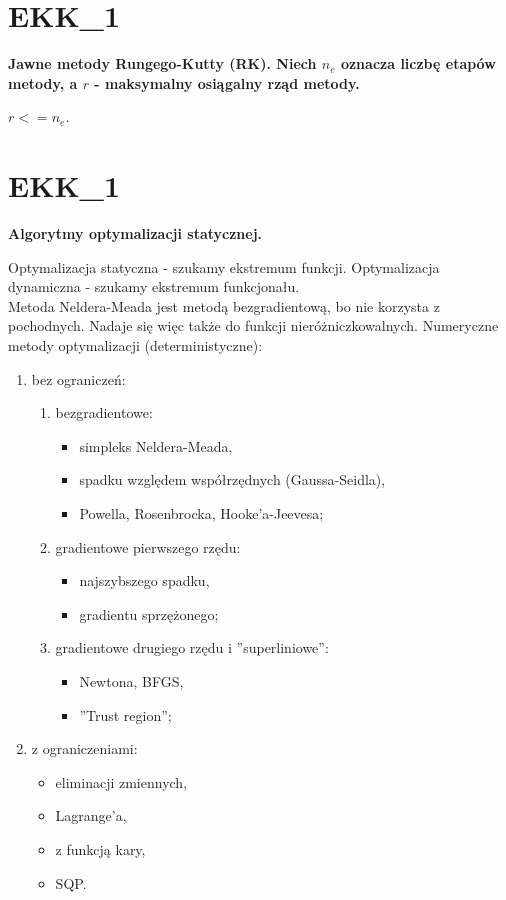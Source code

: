 \section{EKK\_1}
\textbf{Jawne metody Rungego-Kutty (RK). Niech $n_e$ oznacza liczbę etapów metody, a $r$ - maksymalny osiągalny rząd metody.}

\vspace{0.4cm}
\noindent $r<=n_e$.

\section{EKK\_1}
\textbf{Algorytmy optymalizacji statycznej.}

\vspace{0.4cm} Optymalizacja statyczna - szukamy ekstremum funkcji.
Optymalizacja dynamiczna - szukamy ekstremum funkcjonału.\\
Metoda Neldera-Meada jest metodą bezgradientową, bo nie korzysta z pochodnych. Nadaje się więc także do funkcji nieróżniczkowalnych.
Numeryczne metody optymalizacji (deterministyczne): 
\begin{enumerate}
 \item bez ograniczeń:
 \begin{enumerate}
  \item bezgradientowe:
  \begin{itemize}
   \item simpleks Neldera-Meada,
   \item spadku względem współrzędnych (Gaussa-Seidla),
   \item Powella, Rosenbrocka, Hooke'a-Jeevesa;
  \end{itemize}
  \item gradientowe pierwszego rzędu:
  \begin{itemize}
   \item najszybszego spadku,
   \item gradientu sprzężonego;
  \end{itemize}
  \item gradientowe drugiego rzędu i ''superliniowe'':
  \begin{itemize}
   \item Newtona, BFGS,
   \item ''Trust region'';
  \end{itemize}
 \end{enumerate}
 \item z ograniczeniami:
 \begin{itemize}
  \item eliminacji zmiennych,
  \item Lagrange'a,
  \item z funkcją kary,
  \item SQP.
 \end{itemize}
\end{enumerate}

